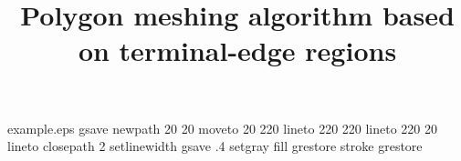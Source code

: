 %
%
%
%
%
\begin{filecontents*}{example.eps}
gsave
newpath
  20 20 moveto
  20 220 lineto 
  220 220 lineto
  220 20 lineto
closepath
2 setlinewidth
gsave
  .4 setgray fill
grestore
stroke
grestore
\end{filecontents*}
%
\RequirePackage{fix-cm}
%
\documentclass[smallextended]{svjour3}       %
%
\smartqed  %
%
\usepackage{graphicx}
\graphicspath{{figures/}}
%
%
\usepackage{subfigure} %
\usepackage{svg}
\usepackage{caption}
\usepackage{geometry}
\usepackage{amsmath,amssymb}
\usepackage{listings}
\usepackage{xcolor}
\usepackage{mdframed} %
\usepackage[shortlabels]{enumitem} %
\usepackage{setspace}

%
%




\title{Polygon meshing algorithm based on terminal-edge regions}%

